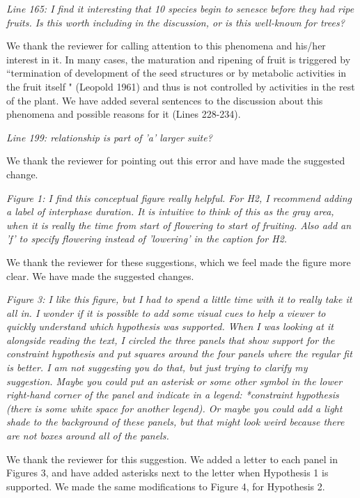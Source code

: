 \documentclass[10.95pt,a4paper]{letter}
\begin{document}
\par \emph{Line 165: I find it interesting that 10 species begin to senesce before they had ripe fruits. Is this worth including in the discussion, or is this well-known for trees?} 
\par We thank the reviewer for calling attention to this phenomena and his/her interest in it. In many cases, the maturation and ripening of fruit is triggered by ``termination of development of the seed structures or by metabolic activities in the fruit itself " (Leopold 1961) and thus is not controlled by activities in the rest of the plant. We have added several sentences to the discussion about this phenomena and possible reasons for it (Lines 228-234).

\par \emph{Line 199: relationship is part of 'a' larger suite?}
\par We thank the reviewer for pointing out this error and have made the suggested change. 


\par \emph{Figure 1: I find this conceptual figure really helpful.  For H2, I recommend adding a label of interphase duration.  It is intuitive to think of this as the gray area, when it is really the time from start of flowering to start of fruiting.  Also add an 'f' to specify flowering instead of 'lowering' in the caption for H2.} 
\par We thank the reviewer for these suggestions, which we feel made the figure more clear. We have made the suggested changes. 


\par \emph{Figure 3:  I like this figure, but I had to spend a little time with it to really take it all in.  I wonder if it is possible to add some visual cues to help a viewer to quickly understand which hypothesis was supported.  When I was looking at it alongside reading the text, I circled the three panels that show support for the constraint hypothesis and put squares around the four panels where the regular fit is better.  I am not suggesting you do that, but just trying to clarify my suggestion.  Maybe you could put an asterisk or some other symbol in the lower right-hand corner of the panel and indicate in a legend: *constraint hypothesis (there is some white space for another legend). Or maybe you could add a light shade to the background of these panels, but that might look weird because there are not boxes around all of the panels.} 
\par We thank the reviewer for this suggestion. We added a letter to each panel in Figures 3, and have added asterisks next to the letter when Hypothesis 1 is supported. We made the same modifications to Figure 4, for Hypothesis 2. \\
\end{document}

